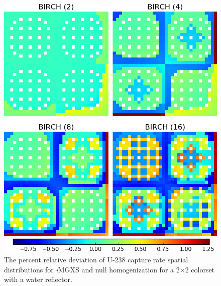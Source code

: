 \begin{figure}[h!]
\centering
\includegraphics[width=0.9\linewidth]{figures/results/compare/reflector/compare-capt}
\vspace{2mm}
\caption[U-238 capture rate comparison for a 2$\times$2 colorset with reflector]{The percent relative deviation of U-238 capture rate spatial distributions for \textit{i}\ac{MGXS} and null homogenization for a 2$\times$2 colorset with a water reflector.}
\label{fig:chap11-refl-capt-rates-comp}
\end{figure}

\clearpage

